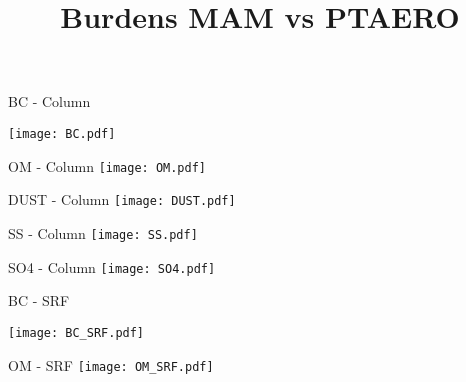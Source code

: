 \documentclass{beamer}
\begin{document}
\title{Burdens MAM vs PTAERO}  

\frame{\titlepage} 


\begin{frame}{BC - Column}
\begin{center}
\texttt{[image: BC.pdf]} 
\end{center}
\end{frame}


\begin{frame}{OM - Column}
\texttt{[image: OM.pdf]} 
\end{frame}


\begin{frame}{DUST - Column}
\texttt{[image: DUST.pdf]} 
\end{frame}


\begin{frame}{SS - Column}
\texttt{[image: SS.pdf]} 
\end{frame}

\begin{frame}{SO4 - Column}
\texttt{[image: SO4.pdf]} 
\end{frame}

\begin{frame}{BC - SRF}
\begin{center}
\texttt{[image: BC\_SRF.pdf]} 
\end{center}
\end{frame}


\begin{frame}{OM - SRF}
\texttt{[image: OM\_SRF.pdf]} 
\end{frame}
\end{document}
